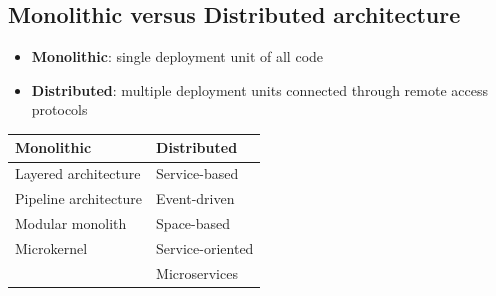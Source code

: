 \begin{flushleft}
  \begin{minipage}{0.47\linewidth}

    \subsection{Monolithic versus Distributed architecture}

    \begin{itemize}
      \item[]  \textbf{Monolithic}: single deployment unit of all code
      \item[] \textbf{Distributed}: multiple deployment units connected through remote
            access protocols
    \end{itemize}

  \end{minipage}%
  \hfill
  \begin{minipage}{0.47\linewidth}
    \raggedright
    \vspace{0pt}
    \raggedright
    \renewcommand{\arraystretch}{1.4}
    \begin{tabular}{ll}
      \textbf{Monolithic}   & \textbf{Distributed} \\
      \hline
      Layered architecture  & Service-based        \\
      Pipeline architecture & Event-driven         \\
      Modular monolith      & Space-based          \\
      Microkernel           & Service-oriented     \\
                            & Microservices        \\
    \end{tabular}
  \end{minipage}
\end{flushleft}
